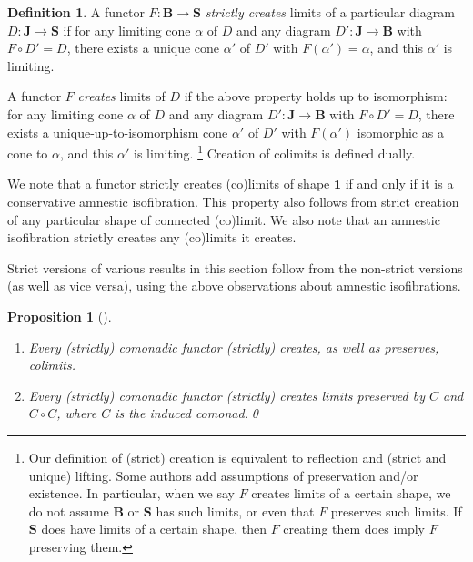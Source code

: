 \documentclass[11pt, oneside, article]{memoir}
\theoremstyle{plain}
\newtheorem{proposition}[theorem]{Proposition}
\theoremstyle{definition}
\newtheorem{definition}[def]{Definition}
\theoremstyle{remark}
\newcommand{\cat}[1]{\mathbf{#1}}
\newcommand{\point}{\mathbf{1}}
\newcommand{\cmnd}[1]{{#1}}
\newcommand{\cC}{\cmnd{C}}
\newcommand{\bB}{\cat{B}}
\newcommand{\bJ}{\cat{J}}
\newcommand{\bS}{\cat{S}}
\begin{document}
\begin{definition}
  A functor $F \colon \bB \to \bS$ \emph{strictly creates} limits of a
  particular diagram $D \colon \bJ \to \bS$ if for any limiting
  cone $\alpha$ of $D$ and any diagram $D' \colon \bJ \to \bB$ with
  $F \circ D' = D$, there exists a unique cone $\alpha'$ of $D'$ with
  $F(\alpha') = \alpha$, and this $\alpha'$ is limiting.

  A functor $F$ \emph{creates} limits of $D$ if the above property holds up to
  isomorphism: for any limiting cone $\alpha$ of $D$ and any diagram
  $D' \colon \bJ \to \bB$ with $F \circ D' = D$, there exists a
  unique-up-to-isomorphism cone $\alpha'$ of $D'$ with $F(\alpha')$ isomorphic as a
  cone to $\alpha$, and this $\alpha'$ is limiting.%
  \footnote{%
    Our definition of (strict) creation is equivalent to reflection and (strict and
    unique) lifting. Some authors add assumptions of
    preservation and/or existence.
    In particular, when we say $F$ creates limits of a certain shape, we
    do not assume $\bB$ or $\bS$ has such limits, or even that $F$
    preserves such limits. If $\bS$ does have limits of a certain shape,
    then $F$ creating them does imply $F$ preserving them.%
  }
  Creation of colimits is defined dually.
\end{definition}

We note that a functor strictly creates (co)limits of shape $\point$
if and only if it is a conservative amnestic isofibration. This
property also follows from strict creation of any particular shape of
connected (co)limit. We also note that an amnestic isofibration
strictly creates any (co)limits it creates.


Strict versions of various results in this section follow from the
non-strict versions (as well as vice versa), using the above
observations about amnestic isofibrations.

\begin{proposition}[{\cite[Theorem 5.6.5]{riehl}}]\label{lem:create}\ \vspace{-1.5em}\\
  \begin{enumerate}[label=(\roman*)]
  \item Every (strictly) comonadic functor (strictly) creates, as well
    as preserves, colimits.
  \item Every (strictly) comonadic functor (strictly) creates limits
    preserved by $\cC$ and $\cC \circ \cC$, where $\cC$ is the induced
    comonad.\qed
  \end{enumerate}
\end{proposition}
\end{document}
